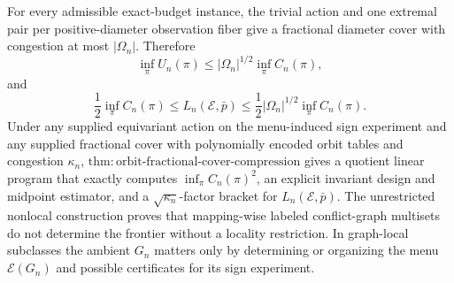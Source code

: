 For every admissible exact-budget instance, the trivial action and one extremal pair per positive-diameter observation fiber give a fractional diameter cover with congestion at most \(|\Omega_n|\). Therefore
\[
 \inf_\pi U_n(\pi)
 \le |\Omega_n|^{1/2}\inf_\pi C_n(\pi),
\]
and
\[
 \frac12\inf_\pi C_n(\pi)
 \le L_n(\mathcal E,\bar p)
 \le\frac12|\Omega_n|^{1/2}\inf_\pi C_n(\pi).
\]
Under any supplied equivariant action on the menu-induced sign experiment and any supplied fractional cover with polynomially encoded orbit tables and congestion \(\kappa_n\), \(\mathrm{thm{:}orbit\text{-}fractional\text{-}cover\text{-}compression}\) gives a quotient linear program that exactly computes \(\inf_\pi C_n(\pi)^2\), an explicit invariant design and midpoint estimator, and a \(\sqrt{\kappa_n}\)-factor bracket for \(L_n(\mathcal E,\bar p)\). The unrestricted nonlocal construction proves that mapping-wise labeled conflict-graph multisets do not determine the frontier without a locality restriction. In graph-local subclasses the ambient \(G_n\) matters only by determining or organizing the menu \(\mathcal E(G_n)\) and possible certificates for its sign experiment.